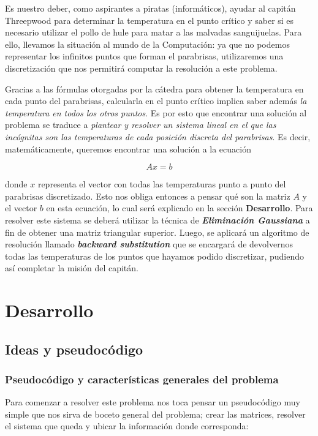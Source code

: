 \vspace{\baselineskip}
\par 
Es nuestro deber, como aspirantes a piratas (informáticos), ayudar al capitán Threepwood para determinar la temperatura en el punto crítico y saber si es necesario utilizar el pollo de hule para matar a las malvadas sanguijuelas. Para ello, llevamos la situación al mundo de la Computación: ya que no podemos representar los infinitos puntos que forman el parabrisas, utilizaremos una discretización que nos permitirá computar la resolución a este problema. 
\par
Gracias a las fórmulas otorgadas por la cátedra para obtener la temperatura en cada punto del parabrisas, calcularla en el punto crítico implica saber además \textit{la temperatura en todos los otros puntos}. Es por esto que encontrar una solución al problema se traduce a \textit{plantear y resolver un sistema lineal en el que las incógnitas son las temperaturas de cada posición discreta del parabrisas}. Es decir, matemáticamente, queremos encontrar una solución a la ecuación

\[ Ax = b \]

donde $x$ representa el vector con todas las temperaturas punto a punto del parabrisas discretizado. Esto nos obliga entonces a pensar qué son la matriz $A$ y el vector $b$ en esta ecuación, lo cual será explicado en la sección \textbf{Desarrollo}. Para resolver este sistema se deberá utilizar la técnica de \textbf{\textit{Eliminación Gaussiana}} a fin de obtener una matriz triangular superior. Luego, se aplicará un algoritmo de resolución llamado \textbf{\textit{backward substitution}} que se encargará de devolvernos todas las temperaturas de los puntos que hayamos podido discretizar, pudiendo así completar la misión del capitán.

\section{Desarrollo}

\subsection{Ideas y pseudocódigo}

\subsubsection{Pseudocódigo y características generales del problema}

Para comenzar a resolver este problema nos toca pensar un pseudocódigo muy simple que nos sirva de boceto general del problema; crear las matrices, resolver el sistema que queda y ubicar la información donde corresponda:

